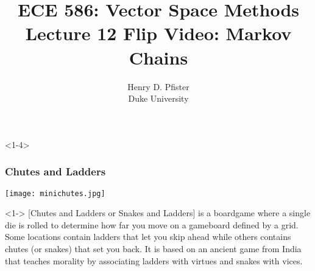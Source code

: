 \documentclass[10pt,english,aspectratio=169,handout]{beamer}
\begin{document}
\title{ECE 586: Vector Space Methods \\ Lecture 12 Flip Video: Markov Chains}
\author{Henry D. Pfister \\ Duke University}
\date{}


\begin{frame}[plain]
	\titlepage
	
\end{frame}

\addtocounter{framenumber}{-1}


\begin{frame}<1-4> \frametitle{Chutes and Ladders}

\vspace{-3mm}

\begin{center}
\texttt{[image: minichutes.jpg]}
\end{center}
\vspace{-4mm}

\begin{example}<1-> [Chutes and Ladders or Snakes and Ladders]
 is a boardgame where a single die is rolled to determine how far you move on a gameboard defined by a grid. Some locations contain ladders that let you skip ahead while others contains chutes (or snakes) that set you back. It is based on an ancient game from India that teaches morality by associating ladders with virtues and snakes with vices.
\end{example}


\vspace{-1mm}


\end{frame}
\end{document}
